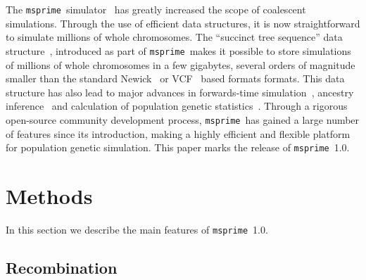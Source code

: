 \documentclass{article}
\newcommand{\msprime}[0]{\texttt{msprime}}
\begin{document}
The \msprime\ simulator~\citep{kelleher2016efficient,kelleher2020coalescent}
has greatly increased the scope of coalescent simulations.
Through the use of efficient data structures, it is
now straightforward to simulate millions of whole chromosomes.
The ``succinct tree sequence'' data
structure~\citep{kelleher2016efficient,kelleher2018efficient,kelleher2019inferring,
wohns2021unified},
introduced as part of \msprime\, makes it possible to store simulations
of millions of whole chromosomes in a few gigabytes, several orders
of magnitude smaller than the standard
Newick~\citep{felsenstein1989phylip} or
VCF~\citep{danecek2011variant} based formats formats.
This data structure has
also lead to major advances in forwards-time
simulation~\citep{kelleher2018efficient,haller2018tree},
ancestry inference~\citep{kelleher2019inferring,wohns2021unified}
and calculation of population genetic statistics~\citep{ralph2019efficiently}.
Through a rigorous open-source community development process,
\msprime\ has gained a large number of features since its introduction,
making a highly efficient and flexible platform for population
genetic simulation.
This paper marks the release of \msprime\ 1.0.

%


\section*{Methods}

In this section we describe the main features of \msprime\ 1.0.

\subsection*{Recombination}
\end{document}
